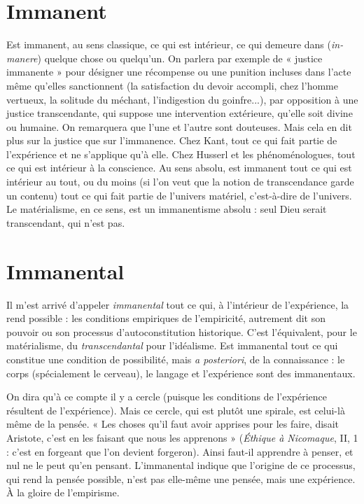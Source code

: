 \section{Immanent}
Est immanent, au sens classique, ce qui est intérieur, ce qui
demeure dans ({\it in-manere}) quelque chose ou quelqu'un. On
parlera par exemple de « justice immanente » pour désigner une récompense ou
une punition incluses dans l’acte même qu’elles sanctionnent (la satisfaction du
devoir accompli, chez l’homme vertueux, la solitude du méchant, l’indigestion
du goinfre...), par opposition à une justice transcendante, qui suppose une intervention
extérieure, qu’elle soit divine ou humaine. On remarquera que l’une et
l’autre sont douteuses. Mais cela en dit plus sur la justice que sur l’immanence.
Chez Kant, tout ce qui fait partie de l’expérience et ne s'applique qu’à elle.
Chez Husserl et les phénoménologues, tout ce qui est intérieur à la conscience.
Au sens absolu, est immanent tout ce qui est intérieur au tout, ou du moins
(si l’on veut que la notion de transcendance garde un contenu) tout ce qui fait
partie de l’univers matériel, c’est-à-dire de l’univers. Le matérialisme, en ce
sens, est un immanentisme absolu : seul Dieu serait transcendant, qui n’est pas.

\section{Immanental}
Il m'est arrivé d’appeler {\it immanental} tout ce qui, à l’intérieur
de l'expérience, la rend possible : les conditions
empiriques de l’empiricité, autrement dit son pouvoir ou son processus d’autoconstitution
historique. C’est l’équivalent, pour le matérialisme, du {\it transcendantal}
pour l’idéalisme. Est immanental tout ce qui constitue une condition de
possibilité, mais {\it a posteriori}, de la connaissance : le corps (spécialement le cerveau),
le langage et l'expérience sont des immanentaux.

On dira qu’à ce compte il y a cercle (puisque les conditions de l’expérience
résultent de l'expérience). Mais ce cercle, qui est plutôt une spirale, est celui-là
même de la pensée. « Les choses qu’il faut avoir apprises pour les faire, disait
Aristote, c’est en les faisant que nous les apprenons » ({\it Éthique à Nicomaque}, II,
1 : c'est en forgeant que l’on devient forgeron). Ainsi faut-il apprendre à
penser, et nul ne le peut qu’en pensant. L’immanental indique que l’origine de
ce processus, qui rend la pensée possible, n’est pas elle-même une pensée, mais
une expérience. À la gloire de l’empirisme.


